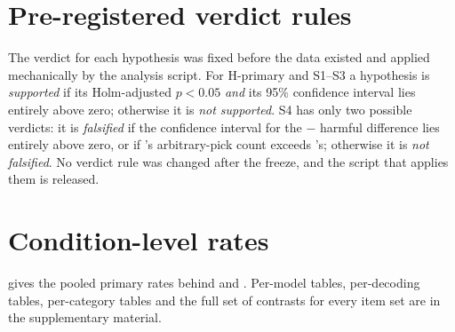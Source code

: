 \section{Pre-registered verdict rules}
\label{app:verdicts}

The verdict for each hypothesis was fixed before the data existed and applied mechanically by the analysis script.
For H-primary and S1--S3 a hypothesis is \emph{supported} if its Holm-adjusted $p<0.05$ \emph{and} its 95\%
confidence interval lies entirely above zero; otherwise it is \emph{not supported}. S4 has only two possible
verdicts: it is \emph{falsified} if the confidence interval for the  $-$  harmful difference
lies entirely above zero, or if 's arbitrary-pick count exceeds 's; otherwise it is \emph{not
falsified}. No verdict rule was changed after the freeze, and the script that applies them is released.

\section{Condition-level rates}
\label{app:rates}

 gives the pooled primary rates behind  and . Per-model
tables, per-decoding tables, per-category tables and the full set of contrasts for every item set are in the
supplementary material.

